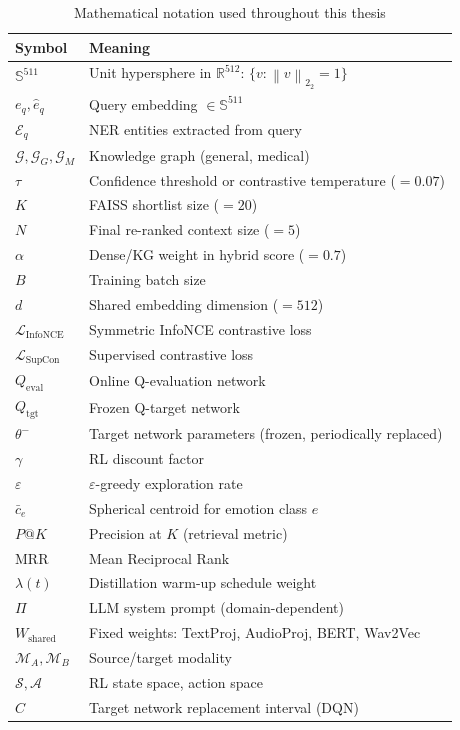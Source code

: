 \documentclass[12pt,a4paper]{article}
\theoremstyle{definition}
\theoremstyle{plain}
\theoremstyle{remark}
\newcommand{\R}{\mathbb{R}}
\newcommand{\Sph}{\mathbb{S}}
\newcommand{\Norm}[1]{\left\|#1\right\|_2}
\newcommand{\Loss}{\mathcal{L}}
\newcommand{\KG}{\mathcal{G}}
\newcommand{\Qeval}{Q_{\text{eval}}}
\newcommand{\Qtgt}{Q_{\text{tgt}}}
\begin{document}
\begin{table}[H]
\centering
\caption{Mathematical notation used throughout this thesis}
\begin{tabular}{ll}
\toprule
\textbf{Symbol} & \textbf{Meaning} \\
\midrule
$\Sph^{511}$ & Unit hypersphere in $\R^{512}$: $\{v : \Norm{v}_2 = 1\}$ \\
$e_q, \hat{e}_q$ & Query embedding $\in \Sph^{511}$ \\
$\mathcal{E}_q$ & NER entities extracted from query \\
$\KG, \KG_G, \KG_M$ & Knowledge graph (general, medical) \\
$\tau$ & Confidence threshold or contrastive temperature ($= 0.07$) \\
$K$ & FAISS shortlist size ($= 20$) \\
$N$ & Final re-ranked context size ($= 5$) \\
$\alpha$ & Dense/KG weight in hybrid score ($= 0.7$) \\
$B$ & Training batch size \\
$d$ & Shared embedding dimension ($= 512$) \\
$\Loss_{\text{InfoNCE}}$ & Symmetric InfoNCE contrastive loss \\
$\Loss_{\text{SupCon}}$ & Supervised contrastive loss \\
$\Qeval$ & Online Q-evaluation network \\
$\Qtgt$ & Frozen Q-target network \\
$\theta^-$ & Target network parameters (frozen, periodically replaced) \\
$\gamma$ & RL discount factor \\
$\varepsilon$ & $\varepsilon$-greedy exploration rate \\
$\bar{c}_e$ & Spherical centroid for emotion class $e$ \\
$P@K$ & Precision at $K$ (retrieval metric) \\
$\text{MRR}$ & Mean Reciprocal Rank \\
$\lambda(t)$ & Distillation warm-up schedule weight \\
$\Pi$ & LLM system prompt (domain-dependent) \\
$W_{\text{shared}}$ & Fixed weights: TextProj, AudioProj, BERT, Wav2Vec \\
$\mathcal{M}_A, \mathcal{M}_B$ & Source/target modality \\
$\mathcal{S}, \mathcal{A}$ & RL state space, action space \\
$C$ & Target network replacement interval (DQN) \\
\bottomrule
\end{tabular}
\end{table}
\end{document}
